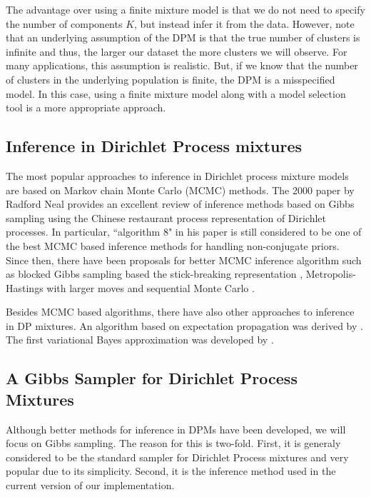 \documentclass[final,3p,times,twocolumn]{elsarticle}
\begin{document}
The advantage over using a finite mixture model is that we do not need to specify the number of components $K$, but instead infer it from the data.
However, note that an underlying assumption of the DPM is that the true number of clusters is infinite and thus, the larger our dataset the more clusters we will observe.
For many applications, this assumption is realistic.
But, if we know that the number of clusters in the underlying population is finite, the DPM is a misspecified model. In this case, using a finite mixture model along with a model selection tool is a more appropriate approach.

\subsection{Inference in Dirichlet Process mixtures}
The most popular approaches to inference in Dirichlet process mixture models are based on Markov chain Monte Carlo (MCMC) methods.
The 2000 paper by Radford Neal \cite{neal2000} provides an excellent review of inference methods based on Gibbs sampling using the Chinese restaurant process representation of Dirichlet processes.
In particular, ``algorithm 8" in his paper is still considered to be one of the best MCMC based inference methods for handling non-conjugate priors.
Since then, there have been proposals for better MCMC inference algorithm such as blocked Gibbs sampling based the stick-breaking representation \cite{ishwaran2001}, Metropolis-Hastings with larger moves \cite{jain2004} and sequential Monte Carlo \cite{fearnhead2004}.

Besides MCMC based algorithms, there have also other approaches to inference in DP mixtures.
An algorithm based on expectation propagation was derived by \cite{minka2003}.
The first variational Bayes approximation was developed by \cite{blei2006}.

\subsection{A Gibbs Sampler for Dirichlet Process Mixtures}
Although better methods for inference in DPMs have been developed, we will focus on Gibbs sampling.
The reason for this is two-fold.
First, it is generaly considered to be the standard sampler for Dirichlet Process mixtures and very popular due to its simplicity.
Second, it is the inference method used in the current version of our implementation.
\end{document}
